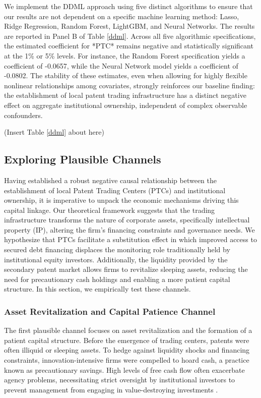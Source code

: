 \documentclass[12pt,a4paper]{article}
\begin{document}
We implement the DDML approach using five distinct algorithms to ensure that our results are not dependent on a specific machine learning method: Lasso, Ridge Regression, Random Forest, LightGBM, and Neural Networks. The results are reported in Panel B of Table \ref{ddml}. Across all five algorithmic specifications, the estimated coefficient for *PTC* remains negative and statistically significant at the 1\% or 5\% levels. For instance, the Random Forest specification yields a coefficient of -0.0657, while the Neural Network model yields a coefficient of -0.0802. The stability of these estimates, even when allowing for highly flexible nonlinear relationships among covariates, strongly reinforces our baseline finding: the establishment of local patent trading infrastructure has a distinct negative effect on aggregate institutional ownership, independent of complex observable confounders.

\begin{center}
    (Insert Table \ref{ddml} about here)
\end{center}

\subsection{Exploring Plausible Channels}
Having established a robust negative causal relationship between the establishment of local Patent Trading Centers (PTCs) and institutional ownership, it is imperative to unpack the economic mechanisms driving this capital linkage. Our theoretical framework suggests that the trading infrastructure transforms the nature of corporate assets, specifically intellectual property (IP), altering the firm's financing constraints and governance needs. We hypothesize that PTCs facilitate a substitution effect in which improved access to secured debt financing displaces the monitoring role traditionally held by institutional equity investors. Additionally, the liquidity provided by the secondary patent market allows firms to revitalize sleeping assets, reducing the need for precautionary cash holdings and enabling a more patient capital structure. In this section, we empirically test these channels.

\subsubsection{Asset Revitalization and Capital Patience Channel}
The first plausible channel focuses on asset revitalization and the formation of a patient capital structure. Before the emergence of trading centers, patents were often illiquid or sleeping assets. To hedge against liquidity shocks and financing constraints, innovation-intensive firms were compelled to hoard cash, a practice known as precautionary savings. High levels of free cash flow often exacerbate agency problems, necessitating strict oversight by institutional investors to prevent management from engaging in value-destroying investments \citep{harford2014refinancing}.
\end{document}
